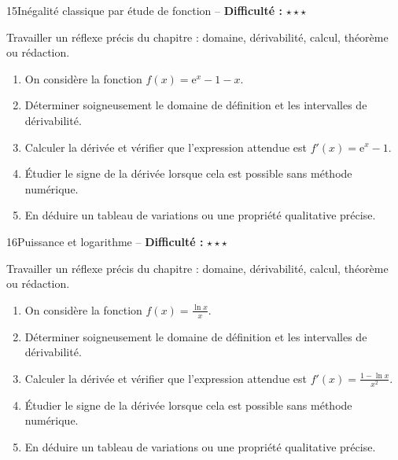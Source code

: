 \documentclass[11pt,a4paper]{article}
\newcommand{\e}{\mathrm{e}}
\newcommand{\etoiles}[1]{\textbf{Difficulté :} #1}
\begin{document}
\begin{exobox}{15}{Inégalité classique par étude de fonction -- \etoiles{$\star\star\star$}}

\begin{objectifbox}
Travailler un réflexe précis du chapitre : domaine, dérivabilité, calcul, théorème ou rédaction.
\end{objectifbox}

\begin{enumerate}

\item On considère la fonction $f(x)=\e^x-1-x$.

\item Déterminer soigneusement le domaine de définition et les intervalles de dérivabilité.

\item Calculer la dérivée et vérifier que l'expression attendue est $f'(x)=\e^x-1$.

\item Étudier le signe de la dérivée lorsque cela est possible sans méthode numérique.

\item En déduire un tableau de variations ou une propriété qualitative précise.

\end{enumerate}

\end{exobox}


\begin{exobox}{16}{Puissance et logarithme -- \etoiles{$\star\star\star$}}

\begin{objectifbox}
Travailler un réflexe précis du chapitre : domaine, dérivabilité, calcul, théorème ou rédaction.
\end{objectifbox}

\begin{enumerate}

\item On considère la fonction $f(x)=\frac{\ln x}{x}$.

\item Déterminer soigneusement le domaine de définition et les intervalles de dérivabilité.

\item Calculer la dérivée et vérifier que l'expression attendue est $f'(x)=\frac{1-\ln x}{x^2}$.

\item Étudier le signe de la dérivée lorsque cela est possible sans méthode numérique.

\item En déduire un tableau de variations ou une propriété qualitative précise.

\end{enumerate}

\end{exobox}
\end{document}
